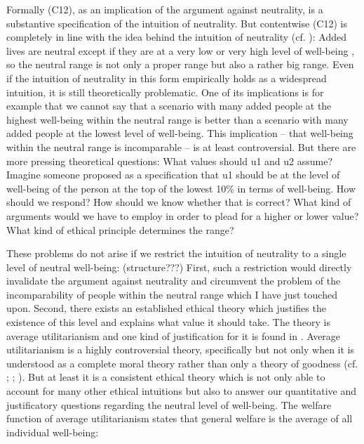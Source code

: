 Formally (C12), as an implication of the argument against neutrality, is a substantive specification of the intuition of neutrality. But contentwise (C12) is completely in line with the idea behind the intuition of neutrality (cf. ): Added lives are neutral except if they are at a very low or very high level of well-being \cite[p.~172]{broome_2012}, so the neutral range is not only a proper range but also a rather big range.  
Even if the intuition of neutrality in this form empirically holds as a widespread intuition, it is still theoretically problematic. One of its implications is for example that we cannot say that a scenario with many added people at the highest well-being within the neutral range is better than a scenario with many added people at the lowest level of well-being. This implication – that well-being within the neutral range is incomparable – is at least controversial. But there are more pressing theoretical questions: What values should u1 and u2 assume? Imagine someone proposed as a specification that u1 should be at the level of well-being of the person at the top of the lowest 10\% in terms of well-being. How should we respond? How should we know whether that is correct? What kind of arguments would we have to employ in order to plead for a higher or lower value? What kind of ethical principle determines the range? 

These problems do not arise if we restrict the intuition of neutrality to a single level of neutral well-being: (structure???) First, such a restriction would directly invalidate the argument against neutrality and circumvent the problem of the incomparability of people within the neutral range which I have just touched upon. Second, there exists an established ethical theory which justifies the existence of this level and explains what value it should take. The theory is average utilitarianism and one kind of justification for it is found in \cite{harsanyi_1955}. Average utilitarianism is a highly controversial theory, specifically but not only when it is understood as a complete moral theory rather than only a theory of goodness (cf. ; ; ). But at least it is a consistent ethical theory which is not only able to account for many other ethical intuitions but also to answer our quantitative and justificatory questions regarding the neutral level of well-being. The welfare function of average utilitarianism states that general welfare is the average of all individual well-being: 

